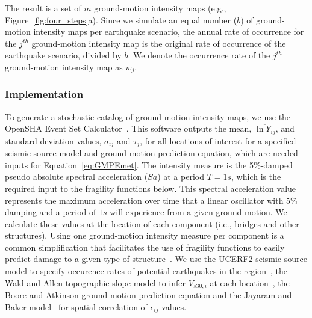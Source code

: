 The result is a set of $m$ ground-motion intensity maps (e.g., Figure~\ref{fig:four_steps}{a}). Since we simulate an equal number ($b$) of ground-motion intensity maps per earthquake scenario, the annual rate of occurrence for the $j^{th}$ ground-motion intensity map is the original rate of occurrence of the earthquake scenario, divided by $b$. We denote the occurrence rate of the $j^{th}$ ground-motion intensity map as $w_j$.  

\subsubsection{Implementation}
To generate a stochastic catalog of ground-motion intensity maps, we use the OpenSHA Event Set Calculator~\cite{field_opensha:_2003}. This software outputs the mean, $\overline{\ln Y_{ij}}$, and standard deviation values, $\sigma_{ij}$ and $\tau_j$, for all locations of interest for a specified seismic source model and ground-motion prediction equation, which are needed inputs for Equation~\ref{eq:GMPEmet}. The intensity measure is the 5\%-damped pseudo absolute  spectral acceleration ($Sa$) at a period $T=1s$, which is the required input to the fragility functions below. This spectral acceleration value represents the maximum acceleration over time  that a linear oscillator with 5\% damping and a period of $1s$ will experience from a given ground motion. We calculate these values at the location of each component (i.e., bridges and other structures). Using one ground-motion intensity measure per component is a common simplification that facilitates the use of fragility functions to easily predict damage to a given type of structure~\cite[e.g.,][]{jayaram_efficient_2010,shinozuka_effect_2003}.
We use the UCERF2 seismic source model to specify occurence rates of potential earthquakes in the region~\cite{field_uniform_2009}, the Wald and Allen topographic slope model to infer $V_{s30,i}$ at each location~\cite{wald_topographic_2007}, the Boore and Atkinson \cite{boore_ground-motion_2008} ground-motion prediction equation and the Jayaram and Baker model~\cite{jayaram_correlation_2009} for spatial correlation of $\epsilon_{ij}$ values.  

